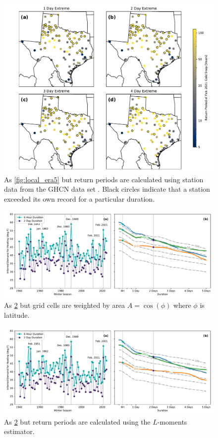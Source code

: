 \documentclass[12pt]{iopart}
\begin{document}
\begin{figure}
  \centering
  \includegraphics[width=\textwidth]{local_rt_ghcnd.pdf}
  \caption{
    As \cref{fig:local_era5} but return periods are calculated using station data from the GHCN data set \cite{Menne:2012hk}.
    Black circles indicate that a station exceeded its own record for a particular duration.
  }\label{fig:local_ghcnd}
\end{figure}

\begin{figure}
  \centering
  \includegraphics[width=\textwidth]{ERCOT_HDD_IDF_MLE_unweighted.pdf}
  \caption{
    As \cref{fig:idf_unweighted} but grid cells are weighted by area $A=\cos(\phi)$ where $\phi$ is latitude.
  }\label{fig:idf_unweighted}
\end{figure}

\begin{figure}
  \centering
  \includegraphics[width=\textwidth]{ERCOT_HDD_IDF_plotpos_popweighted.pdf}
  \caption{
    As \cref{fig:idf_unweighted} but return periods are calculated using the $L$-moments estimator.
  }\label{fig:idf_lmoments_weighted}
\end{figure}
\end{document}
